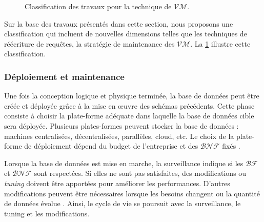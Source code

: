 \begin{figure}
\footnotesize
\begin{center}

\caption{Classification des travaux pour la technique de $\mathcal{VM}$.}
\label{fig:mv-classification}
\end{center}
\end{figure}

Sur la base des travaux présentés dans cette section, nous proposons une classification qui incluent de nouvelles dimensions telles que les techniques de réécriture de requêtes, la stratégie de maintenance des $\mathcal{VM}$. La \ref{fig:mv-classification} illustre cette classification.

\subsubsection{Déploiement et maintenance}
Une fois la conception logique et physique terminée, la base de données peut être créée et déployée grâce à la mise en œuvre des schémas précédents. Cette phase consiste à choisir la plate-forme adéquate dans laquelle la base de données cible sera déployée. Plusieurs plates-formes peuvent stocker la base de données : machines centralisées, décentralisées, parallèles, cloud, etc. Le choix de la plate-forme de déploiement dépend du budget de l'entreprise et des $\mathcal{BNF}$ fixés \cite{Coronel09}.

Lorsque la base de données est mise en marche, la surveillance indique si les $\mathcal{BF}$ et $\mathcal{BNF}$ sont respectées. Si elles ne sont pas satisfaites, des modifications ou \textit{tuning} doivent être apportées pour améliorer les performances. D'autres modifications peuvent être nécessaires lorsque les besoins changent ou la quantité de données évolue \cite{Lightstone10}. Ainsi, le cycle de vie se poursuit avec la surveillance, le tuning et les modifications.

